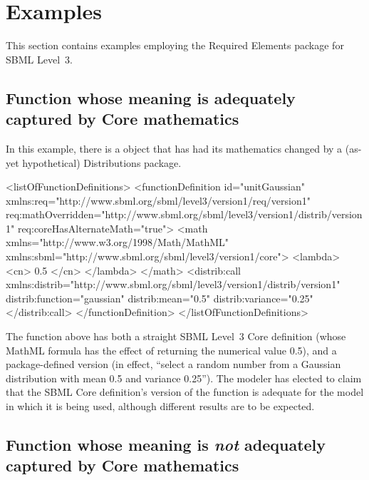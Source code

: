 
\section{Examples}
\label{examples}

This section contains examples employing the Required Elements package for SBML Level~3.

\subsection{Function whose meaning is adequately captured by Core mathematics}

In this example, there is a \FunctionDefinition object that has had its mathematics changed by a (as-yet hypothetical) Distributions package.

\begin{example}
<listOfFunctionDefinitions> 
    <functionDefinition id="unitGaussian" 
                        xmlns:req="http://www.sbml.org/sbml/level3/version1/req/version1"
                        req:mathOverridden="http://www.sbml.org/sbml/level3/version1/distrib/version1" 
                        req:coreHasAlternateMath="true"> 
        <math xmlns="http://www.w3.org/1998/Math/MathML" 
              xmlns:sbml="http://www.sbml.org/sbml/level3/version1/core"> 
             <lambda>
                 <cn> 0.5 </cn>
             </lambda>
        </math> 
        <distrib:call xmlns:distrib="http://www.sbml.org/sbml/level3/version1/distrib/version1"
                      distrib:function="gaussian" distrib:mean="0.5" distrib:variance="0.25"
        </distrib:call> 
    </functionDefinition> 
</listOfFunctionDefinitions> 
\end{example}

The function  above has both a straight SBML Level~3 Core definition (whose MathML formula has the effect of returning the numerical value 0.5), and a package-defined version (in effect, ``select a random number from a Gaussian distribution with mean 0.5 and variance 0.25''). The modeler has elected to claim that the SBML Core definition's version of the function is adequate for the model in which it is being used, although different results are to be expected.


\subsection{Function whose meaning is \emph{not} adequately captured by Core mathematics}

